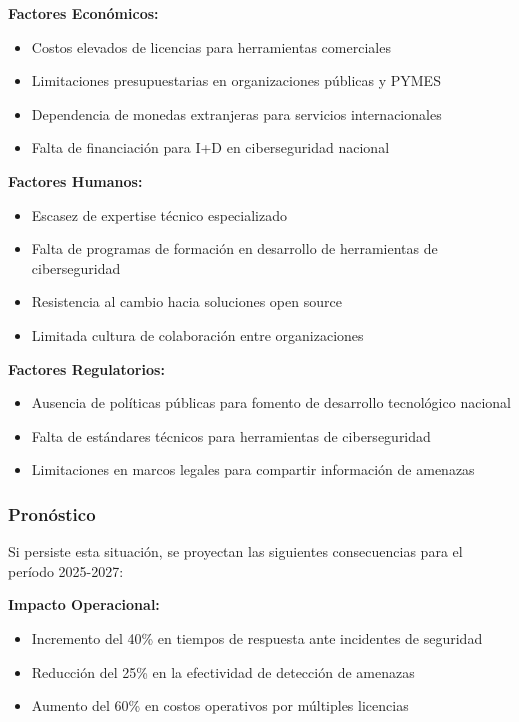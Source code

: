\textbf{Factores Económicos:}
\begin{itemize}
    \item Costos elevados de licencias para herramientas comerciales
    \item Limitaciones presupuestarias en organizaciones públicas y PYMES
    \item Dependencia de monedas extranjeras para servicios internacionales
    \item Falta de financiación para I+D en ciberseguridad nacional
\end{itemize}

\textbf{Factores Humanos:}
\begin{itemize}
    \item Escasez de expertise técnico especializado
    \item Falta de programas de formación en desarrollo de herramientas de ciberseguridad
    \item Resistencia al cambio hacia soluciones open source
    \item Limitada cultura de colaboración entre organizaciones
\end{itemize}

\textbf{Factores Regulatorios:}
\begin{itemize}
    \item Ausencia de políticas públicas para fomento de desarrollo tecnológico nacional
    \item Falta de estándares técnicos para herramientas de ciberseguridad
    \item Limitaciones en marcos legales para compartir información de amenazas
\end{itemize}

\subsubsection{Pronóstico}
Si persiste esta situación, se proyectan las siguientes consecuencias para el período 2025-2027:

\textbf{Impacto Operacional:}
\begin{itemize}
    \item Incremento del 40\% en tiempos de respuesta ante incidentes de seguridad
    \item Reducción del 25\% en la efectividad de detección de amenazas
    \item Aumento del 60\% en costos operativos por múltiples licencias
\end{itemize}

